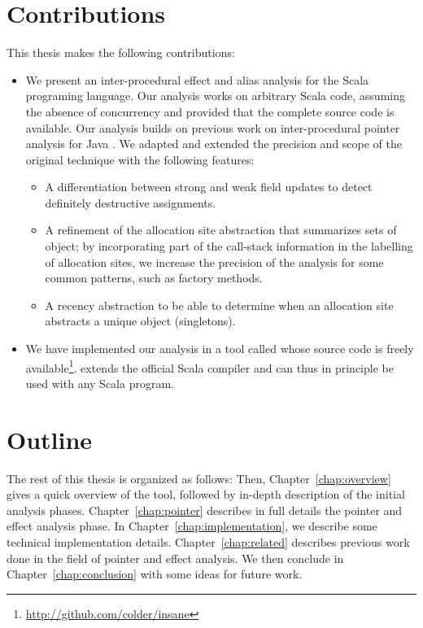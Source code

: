 \section{Contributions}
This thesis makes the following contributions:
\begin{itemize}
    \item
    We present an inter-procedural effect and alias analysis for the Scala
programing language. Our analysis works on arbitrary Scala code, assuming the
absence of concurrency and provided that the complete source code is available.
Our analysis builds on previous work on inter-procedural pointer analysis for
Java \cite{AlexAlexAlexAlex}. 
We adapted and extended the precision and scope of the original technique with the following features:
    \begin{itemize}
        \item A differentiation between strong and weak field updates to detect
definitely destructive assignments.
        \item A refinement of the allocation
site\cite{DBLP:conf/pldi/ChaseWZ90} abstraction that summarizes sets of object;
by incorporating part of the call-stack information in the labelling of
allocation sites, we increase the precision of the analysis for some common
patterns, such as factory methods.
        \item A recency abstraction to be able to determine when an allocation
site abstracts a unique object (singletons).
    \end{itemize}

    \item We have implemented our analysis in a tool called {\insane} whose
source code is freely
available\footnote{\url{http://github.com/colder/insane}}. {\insane} extends
the official Scala compiler and can thus in principle be used with any Scala
program.
\end{itemize}

\section{Outline}
The rest of this thesis is organized as follows: Then,
Chapter~\ref{chap:overview} gives a quick overview of the tool, followed by
in-depth description of the initial analysis phases.
Chapter~\ref{chap:pointer} describes in full details the pointer and effect
analysis phase.  In Chapter~\ref{chap:implementation}, we describe some
technical implementation details. Chapter~\ref{chap:related} describes previous
work done in the field of pointer and effect analysis. We then conclude in
Chapter~\ref{chap:conclusion} with some ideas for future work.
